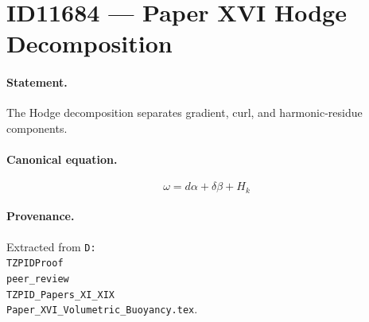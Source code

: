 \section*{ID11684 --- Paper XVI Hodge Decomposition}

\paragraph{Statement.}
The Hodge decomposition separates gradient, curl, and harmonic-residue components.

\paragraph{Canonical equation.}
\[
\omega=d\alpha+\delta\beta+H_k
\]

\paragraph{Provenance.}
Extracted from \texttt{D:\\TZPIDProof\\peer\_review\\TZPID\_Papers\_XI\_XIX\\Paper\_XVI\_Volumetric\_Buoyancy.tex}.
